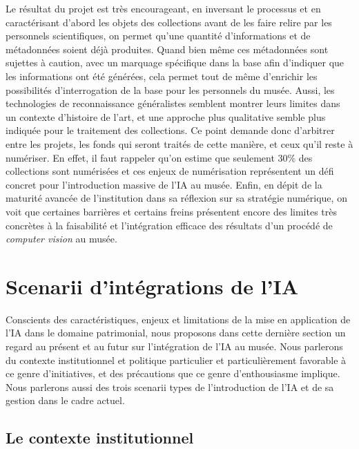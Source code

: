 Le résultat du projet est très encourageant, en inversant le processus et en caractérisant d'abord les objets des collections avant de les faire relire par les personnels scientifiques, on permet qu'une quantité d'informations et de métadonnées soient déjà produites. Quand bien même ces métadonnées sont sujettes à caution, avec un marquage spécifique dans la base afin d'indiquer que les informations ont été générées, cela permet tout de même d'enrichir les possibilités d'interrogation de la base pour les personnels du musée. Aussi, les technologies de reconnaissance généralistes semblent montrer leurs limites dans un contexte d'histoire de l'art, et une approche plus qualitative semble plus indiquée pour le traitement des collections. Ce point demande donc d'arbitrer entre les projets, les fonds qui seront traités de cette manière, et ceux qu'il reste à numériser. En effet, il faut rappeler qu'on estime que seulement 30\% des collections sont numérisées et ces enjeux de numérisation représentent un défi concret pour l'introduction massive de l'IA au musée. Enfin, en dépit de la maturité avancée de l'institution dans sa réflexion sur sa stratégie numérique, on voit que certaines barrières et certains freins présentent encore des limites très concrètes à la faisabilité et l'intégration efficace des résultats d'un procédé de \textit{computer vision} au musée.

\section{Scenarii d’intégrations de l'IA}

Conscients des caractéristiques, enjeux et limitations de la mise en application de l'IA dans le domaine patrimonial, nous proposons dans cette dernière section un regard au présent et au futur sur l'intégration de l'IA au musée. Nous parlerons du contexte institutionnel et politique particulier et particulièrement favorable à ce genre d'initiatives, et des précautions que ce genre d'enthousiasme implique. Nous parlerons aussi des trois scenarii types de l'introduction de l'IA et de sa gestion dans le cadre actuel. 

\subsection{Le contexte institutionnel}

